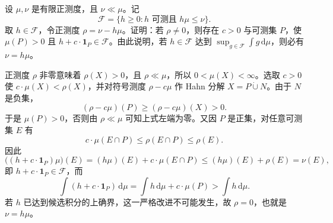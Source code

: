 \begin{exercise}\label{b1:ex:06-rn-residual-improvement}
设 \(\mu,\nu\) 是有限正测度，且 \(\nu\ll\mu\)。记
\[
\mathcal F=\{h\geq0:h\text{ 可测且 }h\mu\leq\nu\}.
\]
取 \(h\in\mathcal F\)，令正测度 \(\rho=\nu-h\mu\)。证明：若 \(\rho\neq0\)，则存在 \(c>0\) 与可测集 \(P\)，使 \(\mu(P)>0\) 且 \(h+c\cdot\mathbf1_P\in\mathcal F\)。由此说明，若 \(h\in\mathcal F\) 达到 \(\sup_{g\in\mathcal F}\int g\,\mathrm d\mu\)，则必有 \(\nu=h\mu\)。
\end{exercise}
\begin{solution}
正测度 \(\rho\) 非零意味着 \(\rho(X)>0\)，且 \(\rho\ll\mu\)，所以 \(0<\mu(X)<\infty\)。选取 \(c>0\) 使 \(c\cdot\mu(X)<\rho(X)\)，并对符号测度 \(\rho-c\mu\) 作 Hahn 分解 \(X=P\mathbin{\dot\cup}N\)。由于 \(N\) 是负集，
\[
(\rho-c\mu)(P)\geq(\rho-c\mu)(X)>0.
\]
于是 \(\mu(P)>0\)，否则由 \(\rho\ll\mu\) 可知上式左端为零。又因 \(P\) 是正集，对任意可测集 \(E\) 有
\[
c\cdot\mu(E\cap P)\leq\rho(E\cap P)\leq\rho(E).
\]
因此
\[
\bigl((h+c\cdot\mathbf1_P)\mu\bigr)(E)
=(h\mu)(E)+c\cdot\mu(E\cap P)
\leq (h\mu)(E)+\rho(E)=\nu(E),
\]
即 \(h+c\cdot\mathbf1_P\in\mathcal F\)，而
\[
\int(h+c\cdot\mathbf1_P)\,\mathrm d\mu
=\int h\,\mathrm d\mu+c\cdot\mu(P)
>\int h\,\mathrm d\mu.
\]
若 \(h\) 已达到候选积分的上确界，这一严格改进不可能发生，故 \(\rho=0\)，也就是 \(\nu=h\mu\)。
\end{solution}
